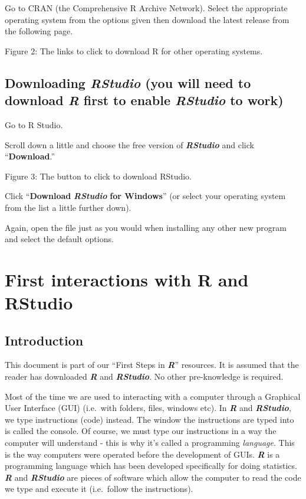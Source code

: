 \documentclass[
]{book}
\begin{document}
Go to CRAN (the Comprehensive R Archive Network). Select the appropriate operating system from the options given then download the latest release from the following page.

Figure 2: The links to click to download R for other operating systems.

\section{\texorpdfstring{Downloading \textbf{\emph{RStudio}} (you will need to download \textbf{\emph{R}} first to enable \textbf{\emph{RStudio}} to work)}{Downloading RStudio (you will need to download R first to enable RStudio to work)}}\label{downloading-rstudio-you-will-need-to-download-r-first-to-enable-rstudio-to-work}

Go to R Studio.

Scroll down a little and choose the free version of \textbf{\emph{RStudio}} and click ``\textbf{Download}.''

Figure 3: The button to click to download RStudio.

Click ``\textbf{Download} \textbf{\emph{RStudio}} \textbf{for Windows}'' (or select your operating system from the list a little further down).

Again, open the file just as you would when installing any other new program and select the default options.

\chapter{First interactions with R and RStudio}\label{first-interactions-with-r-and-rstudio}

\section{Introduction}\label{introduction-1}

This document is part of our ``First Steps in \textbf{\emph{R}}'' resources. It is assumed that the reader has downloaded \textbf{\emph{R}} and \textbf{\emph{RStudio}}. No other pre-knowledge is required.

Most of the time we are used to interacting with a computer through a Graphical User Interface (GUI) (i.e.~with folders, files, windows etc). In \textbf{\emph{R}} and \textbf{\emph{RStudio}}, we type instructions (code) instead. The window the instructions are typed into is called the console. Of course, we must type our instructions in a way the computer will understand - this is why it's called a programming \emph{language}. This is the way computers were operated before the development of GUIs. \textbf{\emph{R}} is a programming language which has been developed specifically for doing statistics. \textbf{\emph{R}} and \textbf{\emph{RStudio}} are pieces of software which allow the computer to read the code we type and execute it (i.e.~follow the instructions).
\end{document}
